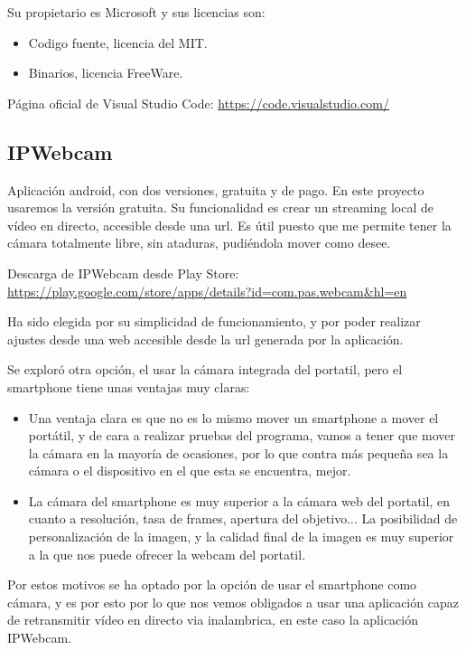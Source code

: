 Su propietario es Microsoft y sus licencias son:
\begin{itemize}
	\item Codigo fuente, licencia del MIT.
	\item Binarios, licencia FreeWare.
\end{itemize}

Página oficial de Visual Studio Code: \url{https://code.visualstudio.com/}

\subsection{IPWebcam}
Aplicación android, con dos versiones, gratuita y de pago. En este proyecto usaremos la versión gratuita.
Su funcionalidad es crear un streaming local de vídeo en directo, accesible desde una url. Es útil puesto que me permite tener la cámara totalmente libre, sin ataduras, pudiéndola mover como desee.

Descarga de IPWebcam desde Play Store: \url{https://play.google.com/store/apps/details?id=com.pas.webcam&hl=en}

Ha sido elegida por su simplicidad de funcionamiento, y por poder realizar ajustes desde una web accesible desde la url generada por la aplicación.

Se exploró otra opción, el usar la cámara integrada del portatil, pero el smartphone tiene unas ventajas muy claras:

\begin{itemize}
	
	\item Una ventaja clara es que no es lo mismo mover un smartphone a mover el portátil, y de cara a realizar pruebas del programa, vamos a tener que mover la cámara en la mayoría de ocasiones, por lo que contra más pequeña sea la cámara o el dispositivo en el que esta se encuentra, mejor.
	
	\item La cámara del smartphone es muy superior a la cámara web del portatil, en cuanto a resolución, tasa de frames, apertura del objetivo... La posibilidad de personalización de la imagen, y la calidad final de la imagen es muy superior a la que nos puede ofrecer la webcam del portatil.
	
\end{itemize}

Por estos motivos se ha optado por la opción de usar el smartphone como cámara, y es por esto por lo que nos vemos obligados a usar una aplicación capaz de retransmitir vídeo en directo via inalambrica, en este caso la aplicación IPWebcam.

